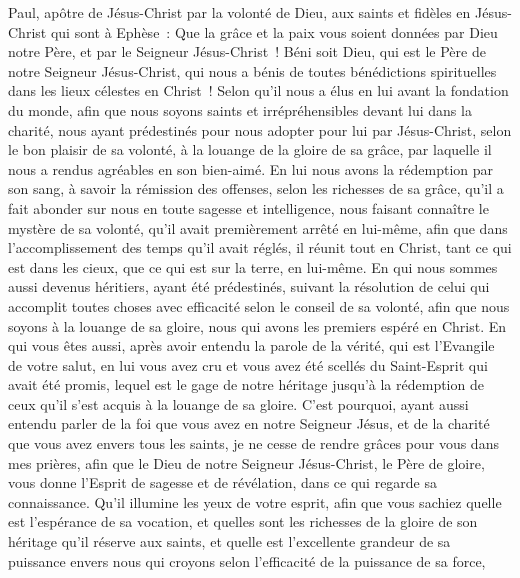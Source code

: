 \par\nobreak\noindent\hrulefill
\begin{multicols}{2}
\VerseOne{}Paul, apôtre de Jésus-Christ par la volonté de Dieu, aux saints et fidèles en Jésus-Christ qui sont à Ephèse~:
Que la grâce et la paix vous soient données par Dieu notre Père, et par le Seigneur Jésus-Christ~!
Béni soit Dieu, qui est le Père de notre Seigneur Jésus-Christ, qui nous a bénis de toutes bénédictions spirituelles dans les lieux célestes en Christ~!
Selon qu'il nous a élus en lui avant la fondation du monde, afin que nous soyons saints et irrépréhensibles devant lui dans la charité,
nous ayant prédestinés pour nous adopter pour lui par Jésus-Christ, selon le bon plaisir de sa volonté,
à la louange de la gloire de sa grâce, par laquelle il nous a rendus agréables en son bien-aimé.
En lui nous avons la rédemption par son sang, à savoir la rémission des offenses, selon les richesses de sa grâce,
qu'il a fait abonder sur nous en toute sagesse et intelligence,
nous faisant connaître le mystère de sa volonté, qu'il avait premièrement arrêté en lui-même,
afin que dans l'accomplissement des temps qu'il avait réglés, il réunit tout en Christ, tant ce qui est dans les cieux, que ce qui est sur la terre, en lui-même.
En qui nous sommes aussi devenus héritiers, ayant été prédestinés, suivant la résolution de celui qui accomplit toutes choses avec efficacité selon le conseil de sa volonté,
afin que nous soyons à la louange de sa gloire, nous qui avons les premiers espéré en Christ.
En qui vous êtes aussi, après avoir entendu la parole de la vérité, qui est l'Evangile de votre salut, en lui vous avez cru et vous avez été scellés du Saint-Esprit qui avait été promis,
lequel est le gage de notre héritage jusqu'à la rédemption de ceux qu'il s'est acquis à la louange de sa gloire.
C'est pourquoi, ayant aussi entendu parler de la foi que vous avez en notre Seigneur Jésus, et de la charité que vous avez envers tous les saints,
je ne cesse de rendre grâces pour vous dans mes prières,
afin que le Dieu de notre Seigneur Jésus-Christ, le Père de gloire, vous donne l'Esprit de sagesse et de révélation, dans ce qui regarde sa connaissance.
Qu'il illumine les yeux de votre esprit, afin que vous sachiez quelle est l'espérance de sa vocation, et quelles sont les richesses de la gloire de son héritage qu'il réserve aux saints,
et quelle est l'excellente grandeur de sa puissance envers nous qui croyons selon l'efficacité de la puissance de sa force,

\end{multicols}
